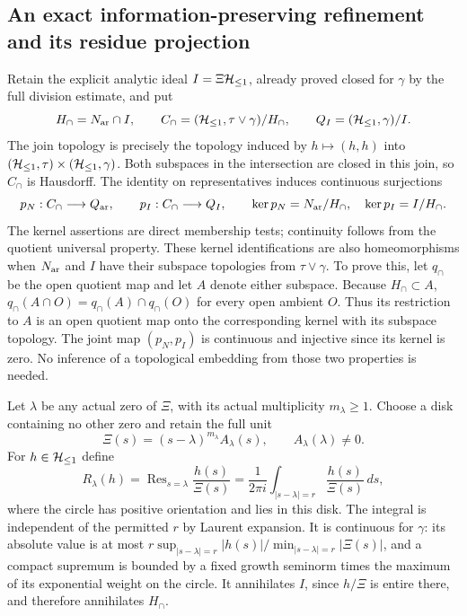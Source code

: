 \subsection{An exact information-preserving refinement and its residue projection}

Retain the explicit analytic ideal $I=\Xi\mathcal H_{\leq 1}$, already proved closed
for $\gamma$ by the full division estimate, and put
\begin{equation}
 H_\cap=N_{\rm ar}\cap I,\qquad
 C_\cap=(\mathcal H_{\leq 1},\tau\vee\gamma)/H_\cap,\qquad
 Q_I=(\mathcal H_{\leq 1},\gamma)/I .
 \label{csq:eq-flow-meet-quotient}
\end{equation}
The join topology is precisely the topology induced by
$h\mapsto(h,h)$ into $(\mathcal H_{\leq 1},\tau)\times(\mathcal H_{\leq 1},\gamma)$.
Both subspaces in the intersection are closed in this join, so
$C_\cap$ is Hausdorff. The identity on representatives induces
continuous surjections
\begin{equation}
 p_N:C_\cap\longrightarrow Q_{\rm ar},\qquad
 p_I:C_\cap\longrightarrow Q_I,\qquad
 \ker p_N=N_{\rm ar}/H_\cap,\quad
 \ker p_I=I/H_\cap .
 \label{csq:eq-flow-meet-maps}
\end{equation}
The kernel assertions are direct membership tests; continuity follows
from the quotient universal property. These kernel identifications
are also homeomorphisms when $N_{\rm ar}$ and $I$ have their subspace
topologies from $\tau\vee\gamma$. To prove this, let $q_\cap$ be
the open quotient map and let $A$ denote either subspace.
Because $H_\cap\subset A$,
$q_\cap(A\cap O)=q_\cap(A)\cap q_\cap(O)$ for every open ambient
$O$. Thus its restriction to $A$ is an open quotient map onto
the corresponding kernel with its subspace topology.
The joint map $(p_N,p_I)$ is continuous and injective since its
kernel is zero. No inference of a topological embedding from those
two properties is needed.

Let $\lambda$ be any actual zero of $\Xi$, with its actual
multiplicity $m_\lambda\geq1$. Choose a disk containing no other zero
and retain the full unit
\[
 \Xi(s)=(s-\lambda)^{m_\lambda}A_\lambda(s),
 \qquad A_\lambda(\lambda)\ne0.
\]
For $h\in\mathcal H_{\leq 1}$ define
\begin{equation}
 R_\lambda(h)
 =\operatorname{Res}_{s=\lambda}\frac{h(s)}{\Xi(s)}
 =\frac1{2\pi i}\int_{|s-\lambda|=r}
                    \frac{h(s)}{\Xi(s)}\,ds ,
 \label{csq:eq-flow-residue-functional}
\end{equation}
where the circle has positive orientation and lies in this disk.
The integral is independent of the permitted $r$ by Laurent
expansion. It is continuous for $\gamma$: its absolute value is
at most $r\sup_{|s-\lambda|=r}|h(s)|/
\min_{|s-\lambda|=r}|\Xi(s)|$, and a compact supremum is bounded
by a fixed growth seminorm times the maximum of its exponential
weight on the circle. It annihilates $I$, since $h/\Xi$ is entire
there, and therefore annihilates $H_\cap$.

